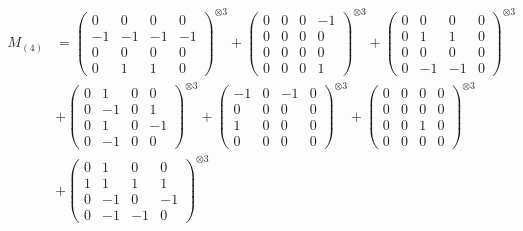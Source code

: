 \documentclass{article}
\newcommand{\Mthree}{%
    M_{(4)}
}
\begin{document}
        \newpage
        
        \footnotesize{
        \begin{align}
        \Mthree
        &= \label{Rs16-Rc11-Solution-7-c1} \begin{pmatrix} 0 & 0 & 0 & 0 \\ -1 & -1 & -1 & -1 \\ 0 & 0 & 0 & 0 \\ 0 & 1 & 1 & 0 \end{pmatrix}^{\otimes 3} 
            + \begin{pmatrix} 0 & 0 & 0 & -1 \\ 0 & 0 & 0 & 0 \\ 0 & 0 & 0 & 0 \\ 0 & 0 & 0 & 1 \end{pmatrix}^{\otimes 3} 
            + \begin{pmatrix} 0 & 0 & 0 & 0 \\ 0 & 1 & 1 & 0 \\ 0 & 0 & 0 & 0 \\ 0 & -1 & -1 & 0 \end{pmatrix}^{\otimes 3} \\
        &+ \label{Rs16-Rc11-Solution-7-c4} \begin{pmatrix} 0 & 1 & 0 & 0 \\ 0 & -1 & 0 & 1 \\ 0 & 1 & 0 & -1 \\ 0 & -1 & 0 & 0 \end{pmatrix}^{\otimes 3} 
            + \begin{pmatrix} -1 & 0 & -1 & 0 \\ 0 & 0 & 0 & 0 \\ 1 & 0 & 0 & 0 \\ 0 & 0 & 0 & 0 \end{pmatrix}^{\otimes 3} 
            + \begin{pmatrix} 0 & 0 & 0 & 0 \\ 0 & 0 & 0 & 0 \\ 0 & 0 & 1 & 0 \\ 0 & 0 & 0 & 0 \end{pmatrix}^{\otimes 3} \\
        &+ \label{Rs16-Rc11-Solution-7-c7} \begin{pmatrix} 0 & 1 & 0 & 0 \\ 1 & 1 & 1 & 1 \\ 0 & -1 & 0 & -1 \\ 0 & -1 & -1 & 0 \end{pmatrix}^{\otimes 3} 

\end{align}}
\end{document}
